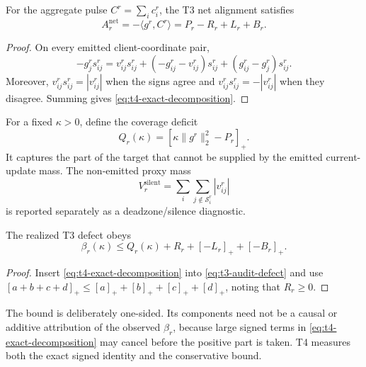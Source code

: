 \begin{proposition}
\label{prop:t4-exact-decomposition}
For the aggregate pulse $C^r=\sum_i c_i^r$, the T3 net alignment satisfies
\begin{equation}
    A_r^{\mathrm{net}}
    =-\langle g^r,C^r\rangle
    =P_r-R_r+L_r+B_r.
    \label{eq:t4-exact-decomposition}
\end{equation}
\end{proposition}

\begin{proof}
On every emitted client-coordinate pair,
\begin{equation}
    -g_j^rs_{ij}^r
    =v_{ij}^rs_{ij}^r
     +(-g_{ij}^r-v_{ij}^r)s_{ij}^r
     +(g_{ij}^r-g_j^r)s_{ij}^r.
\end{equation}
Moreover,
$v_{ij}^rs_{ij}^r=|v_{ij}^r|$ when the signs agree and
$v_{ij}^rs_{ij}^r=-|v_{ij}^r|$ when they disagree.  Summing gives
\eqref{eq:t4-exact-decomposition}.
\end{proof}

For a fixed $\kappa>0$, define the coverage deficit
\begin{equation}
    Q_r(\kappa)
    =\left[\kappa\|g^r\|_2^2-P_r\right]_+.
    \label{eq:t4-coverage-deficit}
\end{equation}
It captures the part of the target that cannot be supplied by the emitted
current-update mass.  The non-emitted proxy mass
\begin{equation}
    V_r^{\mathrm{silent}}
    =\sum_i\sum_{j\notin\mathcal{S}_i^r}|v_{ij}^r|
\end{equation}
is reported separately as a deadzone/silence diagnostic.

\begin{corollary}
\label{cor:t4-defect-upper-bound}
The realized T3 defect obeys
\begin{equation}
    \beta_r(\kappa)
    \leq
    Q_r(\kappa)+R_r+[-L_r]_++[-B_r]_+.
    \label{eq:t4-defect-upper-bound}
\end{equation}
\end{corollary}

\begin{proof}
Insert \eqref{eq:t4-exact-decomposition} into
\eqref{eq:t3-audit-defect} and use
$[a+b+c+d]_+\leq[a]_++[b]_++[c]_++[d]_+$, noting that $R_r\geq0$.
\end{proof}

The bound is deliberately one-sided.  Its components need not be a causal or
additive attribution of the observed $\beta_r$, because large signed terms in
\eqref{eq:t4-exact-decomposition} may cancel before the positive part is
taken.  T4 measures both the exact signed identity and the conservative bound.

